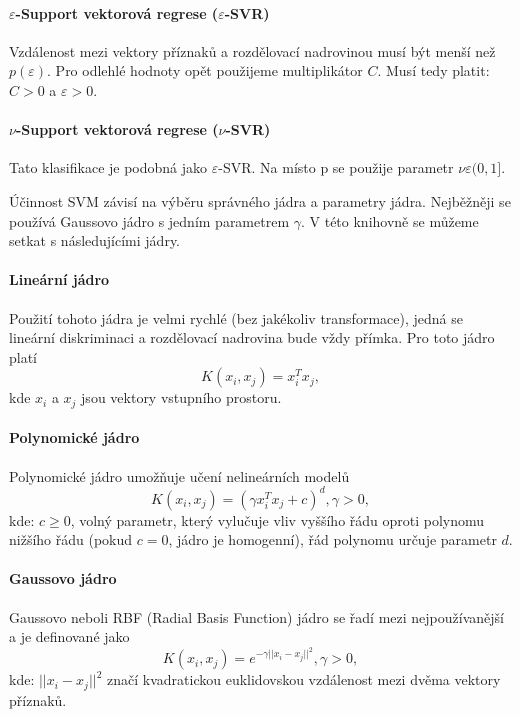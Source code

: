 \paragraph*{$\varepsilon$-Support vektorová regrese ($\varepsilon$-SVR)}
Vzdálenost mezi vektory příznaků a rozdělovací nadrovinou musí být menší než $p (\varepsilon)$. Pro odlehlé hodnoty opět použijeme multiplikátor $C$. Musí tedy platit: $C > 0$ a $\varepsilon > 0$. \cite{svrsvm}

\paragraph*{$\nu$-Support vektorová regrese ($\nu$-SVR)}
Tato klasifikace je podobná jako $\varepsilon$-SVR. Na místo p se použije parametr $\nu \varepsilon (0,1]$. \cite{nusvmsvrclass}

Účinnost SVM závisí na výběru správného jádra a parametry jádra. Nejběžněji se používá Gaussovo jádro s jedním parametrem $\gamma$. V této knihovně se můžeme setkat s následujícími jádry.

\paragraph*{Lineární jádro}
Použití tohoto jádra je velmi rychlé (bez jakékoliv transformace), jedná se lineární diskriminaci a rozdělovací nadrovina bude vždy přímka. Pro toto jádro platí 
\begin{equation*}
 \label{linearK}
  K(x_i, x_j) = x_i^T x_j,
\end{equation*}
  kde $x_i$ a $x_j$ jsou vektory vstupního prostoru.

\paragraph*{Polynomické jádro}
Polynomické jádro umožňuje učení nelineárních modelů
\begin{equation*}
\label{polyK}
  K(x_i, x_j) = (\gamma x_i^T x_j + c)^{d}, \gamma > 0,
\end{equation*}
kde: $c \geq 0$, volný parametr, který vylučuje vliv vyššího řádu oproti polynomu nižšího řádu (pokud $c = 0$, jádro je homogenní), řád polynomu určuje parametr $d$.

\paragraph*{Gaussovo jádro}
Gaussovo neboli RBF (Radial Basis Function) jádro se řadí mezi nejpoužívanější a je definované jako
\begin{equation*}
\label{RBFK}
 K(x_i, x_j) = e^{-\gamma ||x_i - x_j||^2}, \gamma > 0,
\end{equation*}
kde: $||x_i - x_j||^2$ značí kvadratickou euklidovskou vzdálenost mezi dvěma vektory příznaků.

